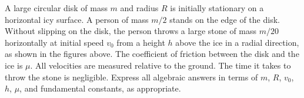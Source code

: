 \documentclass{../../../oss-apphys-exam}
\begin{document}
\begin{questions}
  \newpage


  \question A large circular disk of mass $m$ and radius $R$ is initially
  stationary on a horizontal icy surface. A person of mass $m/2$ stands on the
  edge of the disk. Without slipping on the disk, the person throws a large
  stone of mass $m/20$ horizontally at initial speed $v_0$ from a height
  $h$ above the ice in a radial direction, as shown in the figures above. The
  coefficient of friction between the disk and the ice is $\mu$. All velocities
  are measured relative to the ground. The time it takes to throw the stone is
  negligible. Express all algebraic answers in terms of $m$, $R$, $v_0$,
  $h$, $\mu$, and fundamental constants, as appropriate.
\end{questions}
\end{document}
